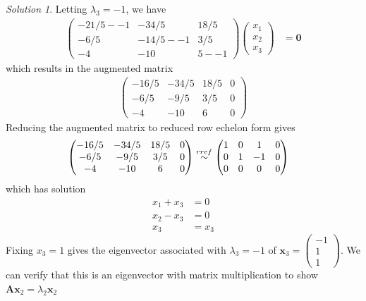 \documentclass[
]{book}
\theoremstyle{definition}
\theoremstyle{definition}
\theoremstyle{definition}
\theoremstyle{definition}
\theoremstyle{remark}
\newtheorem*{solution}{Solution}
\begin{document}
\begin{solution}
Letting \(\lambda_3 = -1\), we have
\[
\begin{aligned}
\begin{pmatrix} 
-21/5  - -1 & -34/5 & 18/5 \\
-6/5 & -14/5 - -1 & 3/5 \\
-4 & -10 & 5 - -1
\end{pmatrix} \begin{pmatrix} x_1 \\ x_2 \\ x_3 \end{pmatrix} & = \mathbf{0}
\end{aligned}
\]
which results in the augmented matrix
\[
\begin{aligned}
\begin{pmatrix} -16/5 & -34/5 & 18/5 & 0 \\ -6/5 & -9/5 & 3/5 & 0 \\ -4 & -10 & 6 & 0 \end{pmatrix}
\end{aligned}
\]
Reducing the augmented matrix to reduced row echelon form gives
\[
\begin{aligned}
\begin{pmatrix} -16/5 & -34/5 & 18/5 & 0 \\ -6/5 & -9/5 & 3/5 & 0 \\ -4 & -10 & 6 & 0 \end{pmatrix} & \stackrel{rref}{\huge \sim} \begin{pmatrix} 1 & 0 & 1 & 0 \\ 0 & 1 & -1 & 0 \\ 0 & 0 & 0 & 0 \end{pmatrix}
\end{aligned}
\]
which has solution
\[
\begin{aligned}
x_1 + x_3 & = 0 \\
x_2  - x_3 & = 0 \\
x_3 & = x_3
\end{aligned}
\]
Fixing \(x_3 = 1\) gives the eigenvector associated with \(\lambda_3 = -1\) of \(\mathbf{x}_3 = \begin{pmatrix} -1 \\ 1 \\ 1 \end{pmatrix}\). We can verify that this is an eigenvector with matrix multiplication to show \(\mathbf{A} \mathbf{x}_2 = \lambda_2 \mathbf{x}_2\)
\[
\begin{aligned}

\end{aligned}\]
\end{solution}
\end{document}
